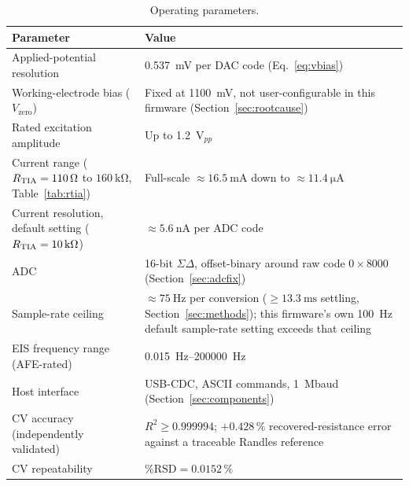 \begin{table}[h]
\centering
\footnotesize
\setlength{\tabcolsep}{4pt}
\caption{Operating parameters.}
\label{tab:params}
\begin{tabular}{@{}p{3.3cm}p{4.3cm}@{}}
\toprule
Parameter & Value \\
\midrule
Applied-potential resolution & \SI{0.537}{\milli\volt} per DAC code
  (Eq.~\eqref{eq:vbias}) \\
Working-electrode bias ($V_{\mathrm{zero}}$) & Fixed at \SI{1100}{\milli\volt},
  not user-configurable in this firmware (Section~\ref{sec:rootcause}) \\
Rated excitation amplitude & Up to \SI{1.2}{\volt}$_{pp}$~\cite{devices2024ad5940} \\
Current range ($R_{\mathrm{TIA}}=\SI{110}{\ohm}$ to $\SI{160}{\kilo\ohm}$,
  Table~\ref{tab:rtia}) & Full-scale $\approx\SI{16.5}{\milli\ampere}$ down
  to $\approx\SI{11.4}{\micro\ampere}$ \\
Current resolution, default setting ($R_{\mathrm{TIA}}=\SI{10}{\kilo\ohm}$) &
  $\approx\SI{5.6}{\nano\ampere}$ per ADC code \\
ADC & 16-bit $\Sigma\Delta$, offset-binary around raw code $0{\times}8000$
  (Section~\ref{sec:adcfix}) \\
Sample-rate ceiling & $\approx\SI{75}{\hertz}$ per conversion
  ($\geq\SI{13.3}{\milli\second}$ settling, Section~\ref{sec:methods});
  this firmware's own \SI{100}{\hertz} default sample-rate setting exceeds
  that ceiling \\
EIS frequency range (AFE-rated) & \SIrange{0.015}{200000}{\hertz}~\cite{devices2024ad5940} \\
Host interface & USB-CDC, ASCII commands, \SI{1}{\mega baud}
  (Section~\ref{sec:components}) \\
CV accuracy (independently validated) & $R^2\geq0.999994$;
  $+0.428\,\%$ recovered-resistance error against a traceable Randles
  reference~\cite{clement2026linearity} \\
CV repeatability & $\%\mathrm{RSD}=0.0152\,\%$~\cite{clement2026linearity} \\
\bottomrule
\end{tabular}
\end{table}
